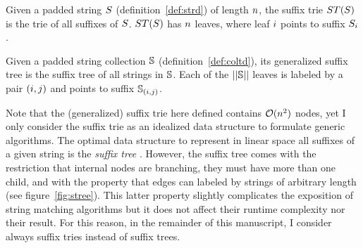 
\begin{definition}
Given a padded string $S$ (definition~\ref{def:strd}) of length $n$, the suffix trie $ST(S)$ is the trie of all suffixes of $S$.
$ST(S)$ has $n$ leaves, where leaf $i$ points to suffix ${S}_{i}$.
\end{definition}

\begin{definition}
Given a padded string collection $\mathbb{S}$ (definition~\ref{def:coltd}), its generalized suffix tree is the suffix tree of all strings in $\mathbb{S}$.
Each of the $||\mathbb{S}||$ leaves is labeled by a pair $(i,j)$ and points to suffix ${\mathbb{S}}_{(i,j)}$.

\end{definition}

\begin{figure}[b]
\caption[Example of suffix trie and suffix tree]{Suffix trie and suffix tree of the string {\ttfamily ANANAS\$} .}
\label{fig:stree}
\begin{subfigure}[b]{.5\textwidth}
\begin{center}

\end{center}
\end{subfigure}%
\begin{subfigure}[b]{.5\textwidth}
\begin{center}

\end{center}
\end{subfigure}
\end{figure}

Note that the (generalized) suffix trie here defined contains $\mathcal{O}(n^2)$ nodes, yet I only consider the suffix trie as an idealized data structure to formulate generic algorithms.
The optimal data structure to represent in linear space all suffixes of a given string is the \emph{suffix tree} \citep{Morrison1968}.
However, the suffix tree comes with the restriction that internal nodes are branching, \ie they must have more than one child, and with the property that edges can labeled by strings of arbitrary length (see figure~\ref{fig:stree}).
This latter property slightly complicates the exposition of string matching algorithms but it does not affect their runtime complexity nor their result.
For this reason, in the remainder of this manuscript, I consider \wlogs always suffix tries instead of suffix trees.

